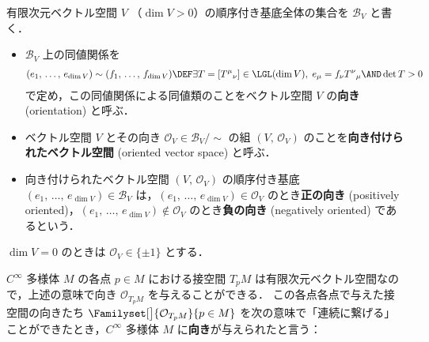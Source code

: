 \documentclass[geometry_main]{subfiles}
\begin{document}
有限次元ベクトル空間 $V$ （$\dim V > 0$）の順序付き基底全体の集合を $\mathcal{B}_V$ と書く．
\begin{itemize}
	\item $\mathcal{B}_V$ 上の同値関係を
	\begin{align}
		(e_1,\, \dots,\, e_{\dim V}) \sim (f_1,\, \dots,\, f_{\dim V}) \DEF \exists T = [T^{\mu}{}_\nu] \in \LGL(\dim V),\; e_\mu = f_\nu T^{\nu}{}_\mu \AND \det T > 0
	\end{align}
	で定め，この同値関係による同値類のことをベクトル空間 $V$ の\textbf{向き} (orientation) と呼ぶ．
	\item ベクトル空間 $V$ とその向き $\mathcal{O}_V \in \mathcal{B}_V / \sim$ の組 $(V,\, \mathcal{O}_V)$ のことを\textbf{向き付けられたベクトル空間} (oriented vector space) と呼ぶ．
	\item 向き付けられたベクトル空間 $(V,\, \mathcal{O}_V)$ の順序付き基底 $(e_1,\, \dots,\, e_{\dim V}) \in \mathcal{B}_V$ は，$(e_1,\, \dots,\, e_{\dim V}) \in \mathcal{O}_V$ のとき\textbf{正の向き} (positively oriented)，$(e_1,\, \dots,\, e_{\dim V}) \notin \mathcal{O}_V$ のとき\textbf{負の向き} (negatively oriented) であるという．
\end{itemize}

\begin{marker}
	$\dim V = 0$ のときは $\mathcal{O}_V \in \{\pm 1\}$ とする．
\end{marker}

$C^\infty$ 多様体 $M$ の各点 $p \in M$ における接空間 $T_p M$ は有限次元ベクトル空間なので，上述の意味で向き $\mathcal{O}_{T_p M}$ を与えることができる．
この各点各点で与えた接空間の向きたち $\Familyset[\big]{\mathcal{O}_{T_p M}}{p \in M}$ を次の意味で「連続に繋げる」ことができたとき，$C^\infty$ 多様体 $M$ に\textbf{向き}が与えられたと言う：
\end{document}
